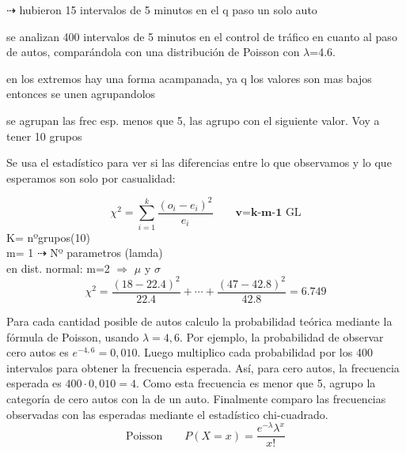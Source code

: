 \documentclass[10pt,a4paper]{article}
\begin{document}
\begin{minipage}[t]{0.36\textwidth}
\vspace{10pt}
{\footnotesize
$\dashrightarrow$ hubieron 15 intervalos de 5 minutos en el q paso un solo auto

\vspace{4pt}
se analizan 400 intervalos de 5 minutos en el control de tráfico en cuanto al paso de autos, comparándola con una distribución de Poisson con $\lambda$=4.6.

\vspace{4pt}
en los extremos hay una forma acampanada, ya q los valores son mas bajos entonces se unen agrupandolos

\vspace{4pt}
se agrupan las frec esp. menos que 5, las agrupo con el siguiente valor. Voy a tener 10 grupos
}
\end{minipage}

\vspace{2pt}
Se usa el estadístico para ver si las diferencias entre lo que observamos y lo que esperamos son solo por casualidad:

\begin{minipage}[t]{0.42\textwidth}
\vspace{0pt}
\[
\chi^2 = \sum_{i=1}^{k} \frac{\left(o_i - e_i\right)^2}{e_i}
\qquad \textbf{v=k-m-1} \text{ GL}
\]
{\small
K= nºgrupos(10) \\
m= 1 $\dashrightarrow$ Nº parametros (lamda) \\
en dist. normal: m=2 $\Rightarrow$ $\mu$ y $\sigma$
}
\[
\chi^2 = \frac{(18-22.4)^2}{22.4} + \cdots + \frac{(47-42.8)^2}{42.8} = 6.749
\]
\end{minipage}\hfill
\begin{minipage}[t]{0.55\textwidth}
\vspace{0pt}
{\footnotesize
Para cada cantidad posible de autos calculo la probabilidad teórica mediante la fórmula de Poisson, usando $\lambda = 4{,}6$. Por ejemplo, la probabilidad de observar cero autos es $e^{-4{,}6} = 0{,}010$. Luego multiplico cada probabilidad por los 400 intervalos para obtener la frecuencia esperada. Así, para cero autos, la frecuencia esperada es $400\cdot 0{,}010 = 4$. Como esta frecuencia es menor que 5, agrupo la categoría de cero autos con la de un auto. Finalmente comparo las frecuencias observadas con las esperadas mediante el estadístico chi-cuadrado.
}
\[
\text{Poisson} \qquad P(X=x) = \frac{e^{-\lambda}\lambda^{x}}{x!}
\]
\end{minipage}
\end{document}

